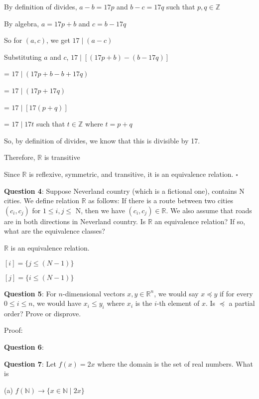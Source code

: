 \documentclass{article} %
\newcommand{\question}[2][]{\begin{flushleft}
        \textbf{Question #1}: #2
\end{flushleft}}
\begin{document}
    \tabto{1cm} By definition of divides, $a - b = 17p$ and $b - c = 17q$ such that $p, q \in \mathbb{Z}$

    \tabto{1cm} By algebra, $a = 17p + b$ and $c = b - 17q$

    \tabto{1cm} So for $(a, c)$, we get $17 \mid (a - c)$

    \tabto{1cm} Substituting $a$ and $c$, $17 \mid [(17p + b) - (b - 17q)]$

    \tabto{3.98 cm} = $17 \mid (17p + b - b + 17q)$

    \tabto{3.98 cm} = $17 \mid (17p + 17q)$

    \tabto{3.98 cm} = $17 \mid [17(p + q)]$

    \tabto{3.98 cm} = $17 \mid 17t$ such that $t \in \mathbb{Z}$ where $t = p + q$

    \tabto{1cm} So, by definition of divides, we know that this is divisible by 17.

    \tabto{1cm} Therefore, $\mathbb{R}$ is transitive

    Since $\mathbb{R}$ is reflexive, symmetric, and transitive, it is an equivalence relation. $\square$

    \question[4]{Suppose Neverland country (which is a fictional one), contains N cities. We define 
    relation $\mathbb{R}$ as follows: If there is a route between two cities $(c_i, c_j)$ for $1 \leq i, j \leq$ N, then we have
    $(c_i, c_j) \in \mathbb{R}$. We also assume that roads are in both directions in Neverland country. Is $\mathbb{R}$ an 
    equivalence relation? If so, what are the equivalence classes?}

    $\mathbb{R}$ is an equivalence relation.

    $[i] = \{j \leq (N - 1) \}$

    $[j] = \{i \leq (N - 1) \}$

    \newpage

    \question[5]{For $n$-dimensional vectors $x, y \in \mathbb{R}^n$, we would say $x \preceq y$ if for every $0 \leq i \leq n$, we
    would have $x_i \leq y_i$ where $x_i$ is the $i$-th element of $x$. Is $\preceq$ a partial order? Prove or disprove.}

    Proof:

    \question[6]{}

    \question[7]{Let $f(x) = 2x$ where the domain is the set of real numbers. What is}

    (a) $f(\mathbb{N}) \rightarrow \{ x \in \mathbb{N} \mid 2x \}$
\end{document}
